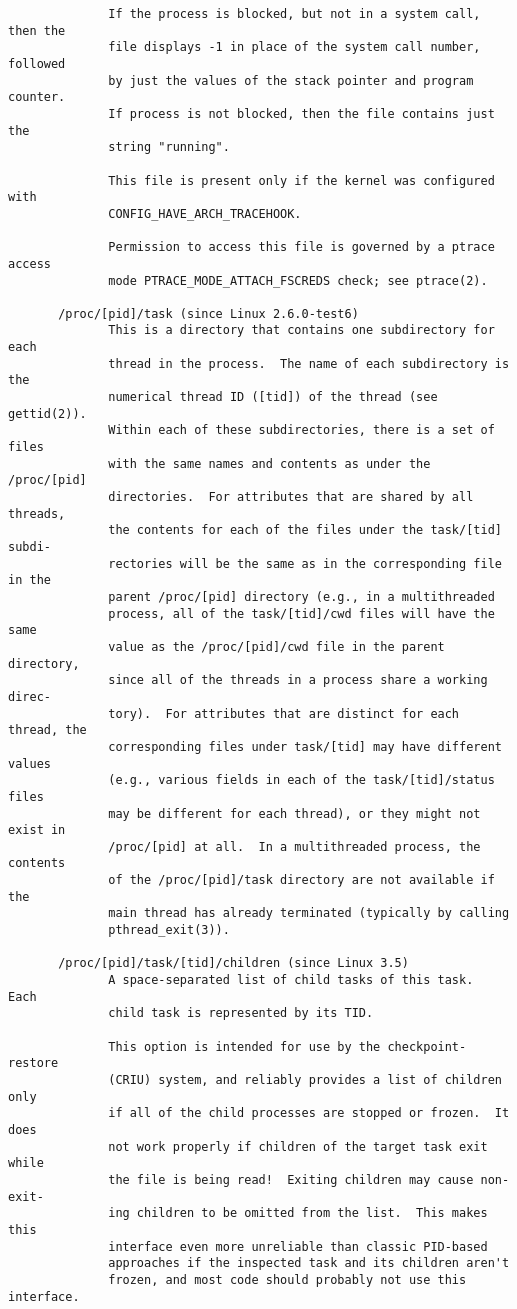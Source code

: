 \documentclass[]{article}
\begin{document}
\begin{verbatim}
              If the process is blocked, but not in a system call, then the
              file displays -1 in place of the system call number, followed
              by just the values of the stack pointer and program counter.
              If process is not blocked, then the file contains just the
              string "running".

              This file is present only if the kernel was configured with
              CONFIG_HAVE_ARCH_TRACEHOOK.

              Permission to access this file is governed by a ptrace access
              mode PTRACE_MODE_ATTACH_FSCREDS check; see ptrace(2).

       /proc/[pid]/task (since Linux 2.6.0-test6)
              This is a directory that contains one subdirectory for each
              thread in the process.  The name of each subdirectory is the
              numerical thread ID ([tid]) of the thread (see gettid(2)).
              Within each of these subdirectories, there is a set of files
              with the same names and contents as under the /proc/[pid]
              directories.  For attributes that are shared by all threads,
              the contents for each of the files under the task/[tid] subdi‐
              rectories will be the same as in the corresponding file in the
              parent /proc/[pid] directory (e.g., in a multithreaded
              process, all of the task/[tid]/cwd files will have the same
              value as the /proc/[pid]/cwd file in the parent directory,
              since all of the threads in a process share a working direc‐
              tory).  For attributes that are distinct for each thread, the
              corresponding files under task/[tid] may have different values
              (e.g., various fields in each of the task/[tid]/status files
              may be different for each thread), or they might not exist in
              /proc/[pid] at all.  In a multithreaded process, the contents
              of the /proc/[pid]/task directory are not available if the
              main thread has already terminated (typically by calling
              pthread_exit(3)).

       /proc/[pid]/task/[tid]/children (since Linux 3.5)
              A space-separated list of child tasks of this task.  Each
              child task is represented by its TID.

              This option is intended for use by the checkpoint-restore
              (CRIU) system, and reliably provides a list of children only
              if all of the child processes are stopped or frozen.  It does
              not work properly if children of the target task exit while
              the file is being read!  Exiting children may cause non-exit‐
              ing children to be omitted from the list.  This makes this
              interface even more unreliable than classic PID-based
              approaches if the inspected task and its children aren't
              frozen, and most code should probably not use this interface.


\end{verbatim}
\end{document}
